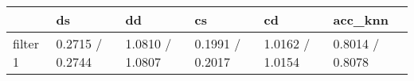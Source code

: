 \begin{tabular}{llllll}
\toprule
{} &               ds &               dd &               cs &               cd &          acc\_knn \\
\midrule
filter 1 &  0.2715 / 0.2744 &  1.0810 / 1.0807 &  0.1991 / 0.2017 &  1.0162 / 1.0154 &  0.8014 / 0.8078 \\
\bottomrule
\end{tabular}
